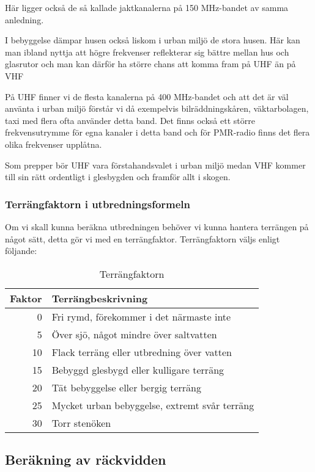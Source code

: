 Här ligger också de så kallade jaktkanalerna på 150 MHz-bandet av samma anledning.

I bebyggelse dämpar husen också liskom i urban miljö de stora husen. Här kan man ibland nyttja att högre frekvenser reflekterar sig bättre mellan hus och glasrutor och man kan därför ha större chans att komma fram på UHF än på VHF

På UHF finner vi de flesta kanalerna på 400 MHz-bandet och att det är väl använta i urban miljö förstår vi då exempelvis bilräddningskåren, väktarbolagen, taxi med flera ofta använder detta band. Det finns också ett större frekvensutrymme för egna kanaler i detta band och för PMR-radio finns det flera olika frekvenser upplåtna.

Som prepper bör UHF vara förstahandsvalet i urban miljö medan VHF kommer till sin rätt ordentligt i glesbygden och framför allt i skogen.

\subsubsection{Terrängfaktorn i utbredningsformeln}

Om vi skall kunna beräkna utbredningen behöver vi kunna hantera terrängen på något sätt, detta gör vi med en terrängfaktor. Terrängfaktorn väljs enligt följande:

\begin{table}[h]
\centering
\begin{tabular}{rl}
	Faktor & Terrängbeskrivning                            \\ \hline
	     0 & Fri rymd, förekommer i det närmaste inte      \\
	     5 & Över sjö, något mindre över saltvatten        \\
	    10 & Flack terräng eller utbredning över vatten    \\
	    15 & Bebyggd glesbygd eller kulligare terräng      \\
	    20 & Tät bebyggelse eller bergig terräng           \\
	    25 & Mycket urban bebyggelse, extremt svår terräng \\
	    30 & Torr stenöken
\end{tabular}
\caption{Terrängfaktorn}
\end{table}

\subsection{Beräkning av räckvidden}

